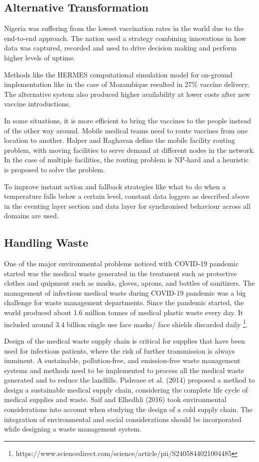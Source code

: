 \documentclass{article}
\begin{document}
 \subsection{Alternative Transformation}
 Nigeria was suffering from the lowest vaccination rates in the world due to the end-to-end approach. The nation used a strategy combining innovations in how data was captured, recorded and used to drive decision making and perform higher levels of uptime.\cite{sarley2017transforming}
 
 Methods like the HERMES computational simulation model for on-ground implementation like in the case of Mozambique resulted in 27\% vaccine delivery. The alternative system also produced higher availability at lower costs after new vaccine introductions.\cite{LEE20164998}
 
 In some situations, it is more efficient to bring the vaccines to the people instead of the other way around. Mobile medical teams need to route vaccines from one location to another. Halper and Raghavan define the mobile facility routing problem, with moving facilities to serve demand at different nodes in the network. In the case of multiple facilities, the routing problem is NP-hard and a heuristic is proposed to solve the problem.\cite{duijzer2018literature}
 
 To improve instant action and fallback strategies like what to do when a temperature falls below a certain level, constant data loggers as described above in the eventing layer section and data layer for synchronised behaviour across all domains are used.
 
 \subsection{Handling Waste}
 
One of the major environmental problems noticed with COVID-19 pandemic started was the medical waste generated in the treatment such as protective clothes and quipment  such as masks, gloves, aprons, and bottles of sanitizers. The management of infectious medical waste during COVID-19 pandemic was a big challenge for waste management departments. Since the pandemic started, the world produced about 1.6 million tonnes of medical plastic waste every day. It included around 3.4 billion single use face masks/ face shields discarded daily \footnote{https://www.sciencedirect.com/science/article/pii/S2405844021004485}. 

Design of the medical waste supply chain is critical for supplies that have been used for infectious patients, where the risk of further transmission is always imminent. A sustainable, pollution-free, and emission-free waste management systems and methods need to be implemented to process all the medical waste generated and to reduce the landfills. Pishvaee et al. (2014) proposed a method to design a sustainable medical supply chain, considering the complete life cycle of medical supplies and waste. Saif and Elhedhli (2016) took environmental considerations into account when studying the design of a cold supply chain. \cite{duijzer2018literature} The integration of environmental and social considerations should be incorporated while designing a waste management system.
 
\end{document}
